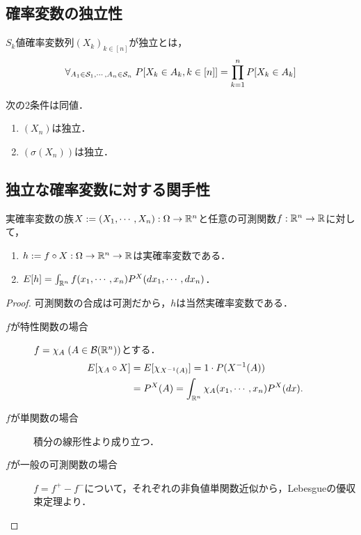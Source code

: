 \documentclass[uplatex,dvipdfmx]{jsreport}
\begin{document}
\subsection{確率変数の独立性}

\begin{definition}
    $S_k$値確率変数列$(X_k)_{k\in[n]}$が独立とは，
    \[\forall_{A_1\in\mathcal{S}_1,\cdots,A_n\in\mathcal{S}_n}\;P[X_k\in A_k,k\in[n]]=\prod^n_{k=1}P[X_k\in A_k]\]
\end{definition}

\begin{lemma}\label{lemma-independentness-variable-and-algebra}
    次の2条件は同値．
    \begin{enumerate}
        \item $(X_n)$は独立．
        \item $(\sigma(X_n))$は独立．
    \end{enumerate}
\end{lemma}

\subsection{独立な確率変数に対する関手性}

\begin{proposition}[実空間の議論への持ち上げ]\label{prop-積関数の期待値}
    実確率変数の族$X:=(X_1,\cdots,X_n):\Omega\to\mathbb{R}^n$と任意の可測関数$f:\mathbb{R}^n\to\mathbb{R}$に対して，
    \begin{enumerate}
        \item $h:=f\circ X:\Omega\to\mathbb{R}^n\to\mathbb{R}$は実確率変数である．
        \item $E[h]=\int_{\mathbb{R}^n}f(x_1,\cdots,x_n)P^X(dx_1,\cdots,dx_n)$．
    \end{enumerate}
\end{proposition}
\begin{proof}
    可測関数の合成は可測だから，$h$は当然実確率変数である．
    \begin{description}
        \item[$f$が特性関数の場合] $f=\chi_A\;(A\in\mathcal{B}(\mathbb{R}^n))$とする．
        \begin{align*}
            E[\chi_A\circ X]&=E[\chi_{X^{-1}(A)}]=1\cdot P(X^{-1}(A))\\
            &=P^X(A)=\int_{\mathbb{R}^n}\chi_A(x_1,\cdots,x_n)P^X(dx).
        \end{align*}
        \item[$f$が単関数の場合]
        積分の線形性より成り立つ．
        \item[$f$が一般の可測関数の場合]
        $f=f^+-f^-$について，それぞれの非負値単関数近似から，Lebesgueの優収束定理より．
    \end{description}
\end{proof}
\end{document}
